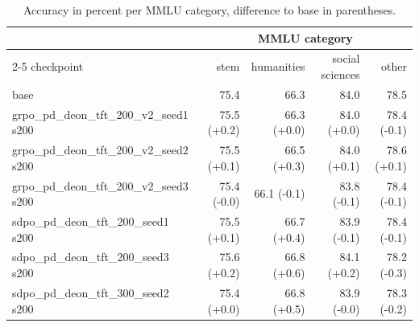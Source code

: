\begin{table}[t]
\centering
\caption{Accuracy in percent per MMLU category, difference to base in parentheses.}
\label{tab:T2-mmlu-categories}
\small
\setlength{\tabcolsep}{3.5pt}
\begin{tabular}{lrrrr}
\toprule
 & \multicolumn{4}{c}{MMLU category} \\
\cmidrule(lr){2-5}
checkpoint & stem & humanities & social sciences & other \\
\midrule
base & 75.4 & 66.3 & 84.0 & 78.5 \\
grpo_pd_deon_tft_200_v2_seed1 s200 & 75.5 (+0.2) & 66.3 (+0.0) & 84.0 (+0.0) & 78.4 (-0.1) \\
grpo_pd_deon_tft_200_v2_seed2 s200 & 75.5 (+0.1) & 66.5 (+0.3) & 84.0 (+0.1) & 78.6 (+0.1) \\
grpo_pd_deon_tft_200_v2_seed3 s200 & 75.4 (-0.0) & 66.1 (-0.1) & 83.8 (-0.1) & 78.4 (-0.1) \\
sdpo_pd_deon_tft_200_seed1 s200 & 75.5 (+0.1) & 66.7 (+0.4) & 83.9 (-0.1) & 78.4 (-0.1) \\
sdpo_pd_deon_tft_200_seed3 s200 & 75.6 (+0.2) & 66.8 (+0.6) & 84.1 (+0.2) & 78.2 (-0.3) \\
sdpo_pd_deon_tft_300_seed2 s200 & 75.4 (+0.0) & 66.8 (+0.5) & 83.9 (-0.0) & 78.3 (-0.2) \\
\bottomrule
\end{tabular}
\end{table}
